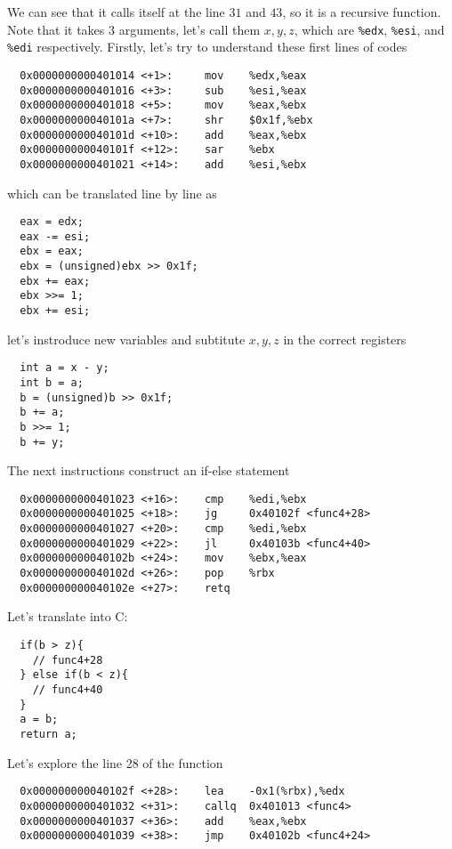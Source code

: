 We can see that it calls itself at the line $31$ and $43$, so it is a recursive function. Note that it takes $3$ arguments, let's call them $x, y, z$, which are \verb+%edx+, \verb+%esi+, and \verb+%edi+ respectively. Firstly, let's try to understand these first lines of codes
{\renewcommand\fcolorbox[4][]{\textcolor{cyan}{\strut#4}}
\begin{verbatim}
  0x0000000000401014 <+1>:     mov    %edx,%eax
  0x0000000000401016 <+3>:     sub    %esi,%eax
  0x0000000000401018 <+5>:     mov    %eax,%ebx
  0x000000000040101a <+7>:     shr    $0x1f,%ebx
  0x000000000040101d <+10>:    add    %eax,%ebx
  0x000000000040101f <+12>:    sar    %ebx
  0x0000000000401021 <+14>:    add    %esi,%ebx
\end{verbatim}
}\noindent
which can be translated line by line as
{\renewcommand\fcolorbox[4][]{\textcolor{black}{\strut#4}}
\begin{verbatim}
  eax = edx;
  eax -= esi;
  ebx = eax;
  ebx = (unsigned)ebx >> 0x1f;
  ebx += eax;
  ebx >>= 1;
  ebx += esi;
\end{verbatim}
}\noindent
let's instroduce new variables and subtitute $x, y, z$ in the correct registers
{\renewcommand\fcolorbox[4][]{\textcolor{black}{\strut#4}}
\begin{verbatim}
  int a = x - y;
  int b = a;
  b = (unsigned)b >> 0x1f;
  b += a;
  b >>= 1;
  b += y;
\end{verbatim}
}\noindent
The next instructions construct an if-else statement
{\renewcommand\fcolorbox[4][]{\textcolor{cyan}{\strut#4}}
\begin{verbatim}
  0x0000000000401023 <+16>:    cmp    %edi,%ebx
  0x0000000000401025 <+18>:    jg     0x40102f <func4+28>
  0x0000000000401027 <+20>:    cmp    %edi,%ebx
  0x0000000000401029 <+22>:    jl     0x40103b <func4+40>
  0x000000000040102b <+24>:    mov    %ebx,%eax
  0x000000000040102d <+26>:    pop    %rbx
  0x000000000040102e <+27>:    retq
\end{verbatim}
}\noindent
Let's translate into C:
{\renewcommand\fcolorbox[4][]{\textcolor{black}{\strut#4}}
\begin{verbatim}
  if(b > z){
    // func4+28
  } else if(b < z){
    // func4+40
  }
  a = b;
  return a;
\end{verbatim}
}\noindent
Let's explore the line 28 of the function
{\renewcommand\fcolorbox[4][]{\textcolor{cyan}{\strut#4}}
\begin{verbatim}
  0x000000000040102f <+28>:    lea    -0x1(%rbx),%edx
  0x0000000000401032 <+31>:    callq  0x401013 <func4>
  0x0000000000401037 <+36>:    add    %eax,%ebx
  0x0000000000401039 <+38>:    jmp    0x40102b <func4+24>
\end{verbatim}
}\noindent
